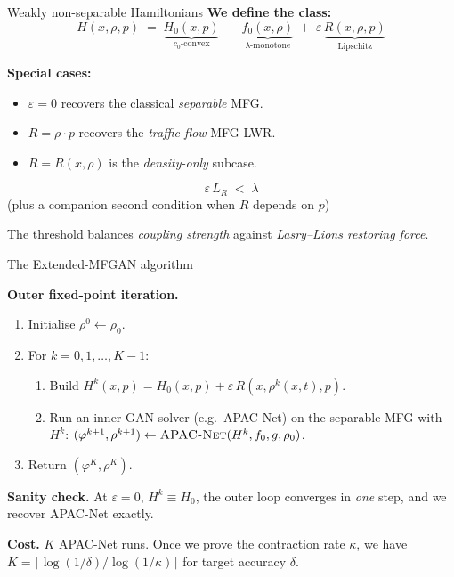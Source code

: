 \documentclass[10pt,aspectratio=169]{beamer}
\newcommand{\eps}{\varepsilon}
\begin{document}
\begin{frame}{Weakly non-separable Hamiltonians}
\textbf{We define the class:}
\[
  H(x,\rho,p) \;=\;
  \underbrace{H_0(x,p)}_{c_0\text{-convex}}
  \;-\; \underbrace{f_0(x,\rho)}_{\lambda\text{-monotone}}
  \;+\; \eps\,\underbrace{R(x,\rho,p)}_{\text{Lipschitz}}
\]

\medskip
\textbf{Special cases:}
\begin{itemize}\setlength\itemsep{1pt}
  \item $\eps = 0$ recovers the classical \emph{separable} MFG.
  \item $R = \rho\cdot p$ recovers the \emph{traffic-flow} MFG-LWR.
  \item $R = R(x,\rho)$ is the \emph{density-only} subcase.
\end{itemize}

\medskip
\begin{resultbox}[title=GAN-tractable regime]
\centering
\[
  \boxed{\;\eps\,L_R \;<\; \lambda\;}
\]
(plus a companion second condition when $R$ depends on $p$)
\end{resultbox}

\medskip
The threshold balances \emph{coupling strength} against
\emph{Lasry--Lions restoring force}.
\end{frame}

\begin{frame}{The Extended-MFGAN algorithm}
\begin{tcolorbox}[colback=kaustblue!5, colframe=kaustblue, arc=3pt]
\textbf{Outer fixed-point iteration.}
\begin{enumerate}\setlength\itemsep{2pt}
  \item Initialise $\rho^0 \leftarrow \rho_0$.
  \item For $k = 0, 1, \ldots, K-1$:
    \begin{enumerate}
      \item Build $H^k(x,p) = H_0(x,p) + \eps\,R(x,\rho^k(x,t),p)$.
      \item Run an inner \alert{GAN solver} (e.g.\ APAC-Net) on the
            separable MFG with $H^k$:
            $(\varphi^{k+1},\rho^{k+1}) \leftarrow \textsc{APAC-Net}(H^k,f_0,g,\rho_0)$.
    \end{enumerate}
  \item Return $(\varphi^K,\rho^K)$.
\end{enumerate}
\end{tcolorbox}

\medskip
\textbf{Sanity check.}  At $\eps=0$, $H^k\equiv H_0$, the outer loop
converges in \emph{one} step, and we recover APAC-Net exactly.

\medskip
\textbf{Cost.}  $K$ APAC-Net runs.  Once we prove the contraction rate
$\kappa$, we have $K = \lceil \log(1/\delta)/\log(1/\kappa)\rceil$ for
target accuracy $\delta$.
\end{frame}
\end{document}
